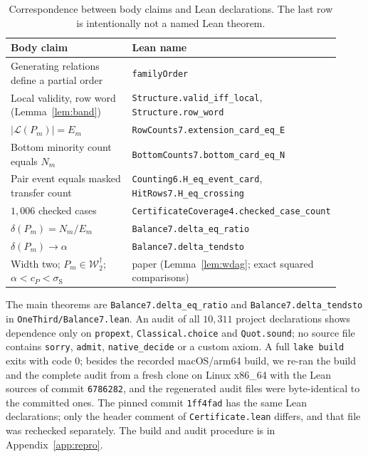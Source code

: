 \documentclass[11pt]{amsart}
\theoremstyle{definition}
\theoremstyle{remark}
\newcommand{\Lin}{\mathcal{L}}
\newcommand{\Wdag}{\mathcal{W}_2^{\dagger}}
\newcommand{\pin}{1ff4fad}
\begin{document}
\begin{table}[h]
\centering
{\footnotesize
\begin{tabular}{@{}p{0.42\linewidth}p{0.50\linewidth}@{}}
\toprule
Body claim & Lean name \\
\midrule
Generating relations define a partial order & \texttt{familyOrder} \\
Local validity, row word (Lemma~\ref{lem:band}) & \texttt{Structure.valid\_iff\_local}, \newline\texttt{Structure.row\_word} \\
$|\Lin(P_m)|=E_m$ & \texttt{RowCounts7.extension\_card\_eq\_E} \\
Bottom minority count equals $N_m$ & \texttt{BottomCounts7.bottom\_card\_eq\_N} \\
Pair event equals masked transfer count & \texttt{Counting6.H\_eq\_event\_card}, \newline\texttt{HitRows7.H\_eq\_crossing} \\
$1{,}006$ checked cases & \texttt{CertificateCoverage4.checked\_case\_count} \\
$\delta(P_m)=N_m/E_m$ & \texttt{Balance7.delta\_eq\_ratio} \\
$\delta(P_m)\to\alpha$ & \texttt{Balance7.delta\_tendsto} \\
Width two; $P_m\in\Wdag$; $\alpha<c_P<\sigma_{\mathrm S}$ & paper (Lemma~\ref{lem:wdag}; exact squared comparisons) \\
\bottomrule
\end{tabular}}
\caption{Correspondence between body claims and Lean declarations. The last row is intentionally not a named Lean theorem.}\label{tab:lean}
\end{table}

The main theorems are \texttt{Balance7.delta\_eq\_ratio} and \texttt{Balance7.delta\_tendsto} in \texttt{OneThird/Balance7.lean}. An audit of all $10{,}311$ project declarations shows dependence only on \texttt{propext}, \texttt{Classical.choice} and \texttt{Quot.sound}; no source file contains \texttt{sorry}, \texttt{admit}, \texttt{native\_decide} or a custom axiom. A full \texttt{lake build} exits with code $0$; besides the recorded macOS/arm64 build, we re-ran the build and the complete audit from a fresh clone on Linux x86\_64 with the Lean sources of commit \texttt{6786282}, and the regenerated audit files were byte-identical to the committed ones. The pinned commit \texttt{\pin} has the same Lean declarations; only the header comment of \texttt{Certificate.lean} differs, and that file was rechecked separately. The build and audit procedure is in Appendix~\ref{app:repro}.
\end{document}
